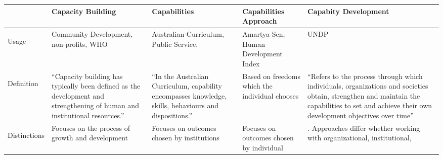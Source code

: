 


 \begin{sidewaystable}

\begin{tabu} to 1.0 \textwidth {|| X | X | X | X | X ||} 
	\hline 
	\rule[-1ex]{0pt}{2.5ex} & Capacity Building & Capabilities & Capabilities Approach & Capabity Development \\ 
	\hline 
	\rule[-1ex]{0pt}{2.5ex} \begin{sideways} Usage \end{sideways} & Community Development, non-profits, WHO & Australian Curriculum, Public Service, & Amartya Sen, Human Development Index & UNDP \\ 
	\hline 
	\rule[-1ex]{0pt}{2.5ex} \begin{sideways} Definition \end{sideways} & “Capacity building has typically been defined as the development and strengthening of human and institutional resources.” 
	& “In the Australian Curriculum, capability encompasses knowledge, skills, behaviours and dispositions.” 
	& Based on freedoms which the individual chooses 
	& “Refers to the process through which individuals, organizations and societies obtain, strengthen and maintain the capabilities to set and achieve their own development objectives over time” \\ 
	\hline 
	\rule[-1ex]{0pt}{2.5ex} \begin{sideways} Distinctions \end{sideways} & Focuses on the process of growth and development & Focuses on outcomes chosen by institutions & Focuses on outcomes chosen by individual & . Approaches differ whether working with organizational, institutional,

\end{tabu}
\end{sidewaystable}
